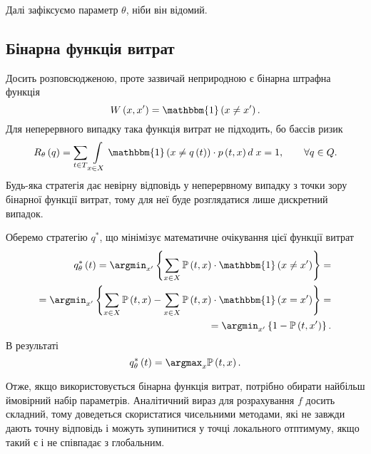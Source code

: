 Далі зафіксуємо параметр $\theta$, ніби він відомий.

\subsection{Бінарна функція витрат}

Досить розповсюдженою, проте зазвичай неприродною є бінарна штрафна функція
\begin{equation*}
  W \left( x, x' \right)
  = \mathbbm{1} \left( x \neq x' \right).
\end{equation*}
Для неперервного випадку така функція витрат не підходить,
бо баєсів ризик
\begin{equation*}
  R_{\theta}\left( q \right)
  = \sum\limits_{t \in T}
    \int\limits_{x \in X}
    \mathbbm{1} \left( x \neq q\left( t \right) \right)
    \cdot p\left( t, x \right) d\; x
  = 1,\qquad
  \forall q \in Q.
\end{equation*}
Будь-яка стратегія дає невірну відповідь у неперервному випадку
з точки зору бінарної функції витрат,
тому для неї буде розглядатися лише дискретний випадок.

Оберемо стратегію $q^*$,
що мінімізує математичне очікування цієї функції витрат
\begin{equation*}
  \begin{split}
    q^*_{\theta}\left( t \right)
    = \argmin_{x'} \left\{
      \sum\limits_{x \in X}
        \mathbb{P}\left( t, x \right)
        \cdot \mathbbm{1} \left( x \neq x' \right)
      \right\} = \\
    = \argmin_{x'} \left\{
      \sum\limits_{x \in X}
        \mathbb{P}\left( t, x \right)
      - \sum\limits_{x \in X}
        \mathbb{P}\left( t, x \right)
        \cdot \mathbbm{1} \left( x = x' \right)
      \right\} = \\
    = \argmin_{x'} \left\{
      1 - \mathbb{P}\left( t, x' \right)
      \right\}.
  \end{split}
\end{equation*}
В результаті
\begin{equation*}
  q^*_{\theta}\left( t \right)
  = \argmax_x \mathbb{P} \left( t, x \right).
\end{equation*}

Отже, якщо використовується бінарна функція витрат,
потрібно обирати найбільш ймовірний набір параметрів.
Аналітичний вираз для розрахування $f$ досить складний,
тому доведеться скористатися чисельними методами,
які не завжди дають точну відповідь
і можуть зупинитися у точці локального отптимуму, якщо такий є
і не співпадає з глобальним.

